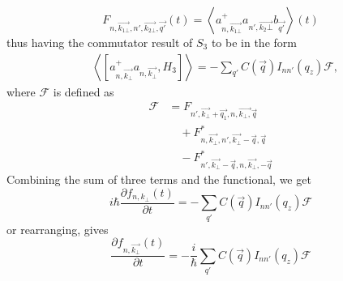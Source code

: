 \documentclass[%
 reprint,
 amsmath,amssymb,
 aps,
]{revtex4-2}
\begin{document}
\begin{equation}
    F_{n,\vec{k_{1\bot}},n', \vec{k_{2\bot}},\vec{q'}}(t) = \left\langle a^+_{n, \vec{k_{1\bot}}}a_{n',\vec{k_2\bot}} b_{\vec{q'}}\right\rangle(t)
\end{equation}
thus having the commutator result of $S_{3}$ to be in the form
\begin{equation}
    \begin{split}
        & \left\langle \left[a^+_{n, \vec{k_\bot}}a_{n,\vec{k_\bot}}, H_{3}\right]\right\rangle  = -\sum_{q'} C\left(\vec{q}\right)I_{nn'}\left(q_z\right) \mathcal{F} ,
    \end{split}
\end{equation}
where $\mathcal{F}$ is defined as
\begin{equation}
    \begin{split}
        \mathcal{F}&=F_{n',\vec{k_\bot}+\vec{q_1},n,\vec{k_\bot,}\vec{q}}\\
        &\quad +F^*_{n,\vec{k_\bot},n',\vec{k_\bot}-\vec{q},\vec{q}}\\
        &\quad -F^*_{n',\vec{k_\bot}-\vec{q},n,\vec{k_\bot},-\vec{q}}
    \end{split}
\end{equation}
Combining the sum of three terms and the functional, we get
\begin{equation}
     i \hbar \frac{\partial f_{n, k_{\perp}}(t)}{\partial t} = -\sum_{q'} C\left(\vec{q}\right)I_{nn'}\left(q_z\right) \mathcal{F}
\end{equation}
or rearranging, gives
\begin{equation}
     \dfrac{\partial f_{n, \vec{k_\bot}}(t)}{\partial t} = -\dfrac{i}{\hbar}\sum_{q'} C\left(\vec{q}\right)I_{nn'}\left(q_z\right) \mathcal{F}
\end{equation}
\end{document}
